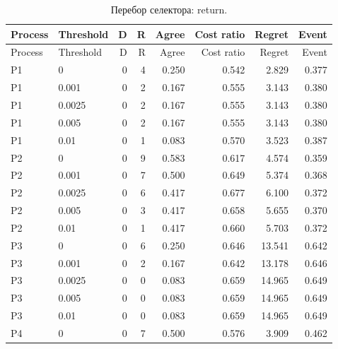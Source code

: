 \begingroup\small\setlength{\tabcolsep}{3pt}\begin{longtable}{llrrrrrr}\caption{Перебор селектора: return.}\\\toprule

Process & Threshold & D & R & Agree & Cost ratio & Regret & Event\\\midrule\endfirsthead

\toprule Process & Threshold & D & R & Agree & Cost ratio & Regret & Event\\\midrule\endhead

P1 & 0 & 0 & 4 & 0.250 & 0.542 & 2.829 & 0.377\\

P1 & 0.001 & 0 & 2 & 0.167 & 0.555 & 3.143 & 0.380\\

P1 & 0.0025 & 0 & 2 & 0.167 & 0.555 & 3.143 & 0.380\\

P1 & 0.005 & 0 & 2 & 0.167 & 0.555 & 3.143 & 0.380\\

P1 & 0.01 & 0 & 1 & 0.083 & 0.570 & 3.523 & 0.387\\

P2 & 0 & 0 & 9 & 0.583 & 0.617 & 4.574 & 0.359\\

P2 & 0.001 & 0 & 7 & 0.500 & 0.649 & 5.374 & 0.368\\

P2 & 0.0025 & 0 & 6 & 0.417 & 0.677 & 6.100 & 0.372\\

P2 & 0.005 & 0 & 3 & 0.417 & 0.658 & 5.655 & 0.370\\

P2 & 0.01 & 0 & 1 & 0.417 & 0.660 & 5.703 & 0.372\\

P3 & 0 & 0 & 6 & 0.250 & 0.646 & 13.541 & 0.642\\

P3 & 0.001 & 0 & 2 & 0.167 & 0.642 & 13.178 & 0.646\\

P3 & 0.0025 & 0 & 0 & 0.083 & 0.659 & 14.965 & 0.649\\

P3 & 0.005 & 0 & 0 & 0.083 & 0.659 & 14.965 & 0.649\\

P3 & 0.01 & 0 & 0 & 0.083 & 0.659 & 14.965 & 0.649\\

P4 & 0 & 0 & 7 & 0.500 & 0.576 & 3.909 & 0.462\\


\end{longtable}
